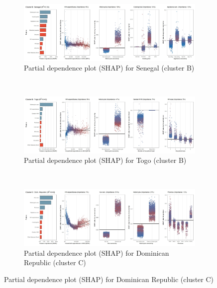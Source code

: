 \begin{figure}[ht!]\ContinuedFloat
    \centering
   \begin{subfigure}[b]{\textwidth}
   \centering
         \caption{Partial dependence plot (SHAP) for Senegal (cluster B)}
         \label{fig:5b_SEN}
         \includegraphics[width=\textwidth]{Figure 5b/Figure_5b_SEN}  
         \end{subfigure}
    \\
    \vspace{0.5cm}
   \begin{subfigure}[b]{\textwidth}    
   \centering
         \caption{Partial dependence plot (SHAP) for Togo (cluster B)}
         \label{fig:5b_TGO}
         \includegraphics[width=\textwidth]{Figure 5b/Figure_5b_TGO}    
   \end{subfigure}
    \\
    \vspace{0.5cm}
   \begin{subfigure}[b]{\textwidth} 
   \centering
         \caption{Partial dependence plot (SHAP) for Dominican Republic (cluster C)}
         \label{fig:5b_DOM}
         \includegraphics[width=\textwidth]{Figure 5b/Figure_5b_DOM}

\end{subfigure}
\end{figure}
